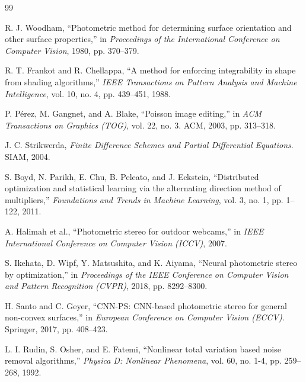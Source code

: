 \documentclass[11pt]{article}
\begin{document}
\newpage
\begin{thebibliography}{99}

 R. J. Woodham, ``Photometric method for determining surface orientation and other surface properties,'' in \textit{Proceedings of the International Conference on Computer Vision}, 1980, pp. 370--379.

 R. T. Frankot and R. Chellappa, ``A method for enforcing integrability in shape from shading algorithms,'' \textit{IEEE Transactions on Pattern Analysis and Machine Intelligence}, vol. 10, no. 4, pp. 439--451, 1988.

 P. P\'erez, M. Gangnet, and A. Blake, ``Poisson image editing,'' in \textit{ACM Transactions on Graphics (TOG)}, vol. 22, no. 3. ACM, 2003, pp. 313--318.

 J. C. Strikwerda, \textit{Finite Difference Schemes and Partial Differential Equations}. SIAM, 2004.

 S. Boyd, N. Parikh, E. Chu, B. Peleato, and J. Eckstein, ``Distributed optimization and statistical learning via the alternating direction method of multipliers,'' \textit{Foundations and Trends in Machine Learning}, vol. 3, no. 1, pp. 1--122, 2011.

 A. Halimah et al., ``Photometric stereo for outdoor webcams,'' in \textit{IEEE International Conference on Computer Vision (ICCV)}, 2007.

 S. Ikehata, D. Wipf, Y. Matsushita, and K. Aiyama, ``Neural photometric stereo by optimization,'' in \textit{Proceedings of the IEEE Conference on Computer Vision and Pattern Recognition (CVPR)}, 2018, pp. 8292--8300.

 H. Santo and C. Geyer, ``CNN-PS: CNN-based photometric stereo for general non-convex surfaces,'' in \textit{European Conference on Computer Vision (ECCV)}. Springer, 2017, pp. 408--423.

 L. I. Rudin, S. Osher, and E. Fatemi, ``Nonlinear total variation based noise removal algorithms,'' \textit{Physica D: Nonlinear Phenomena}, vol. 60, no. 1-4, pp. 259--268, 1992.

\end{thebibliography}
\end{document}

